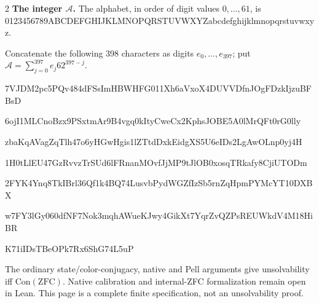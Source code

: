 \documentclass[10pt]{article}
\begin{document}
\begin{multicols}{2}
\textbf{The integer $\mathcal A$.}
The alphabet, in order of digit values $0,\ldots,61$, is
{\fontsize{7.7}{8.2}\selectfont\ttfamily 0123456789ABCDEFGHIJKLMNOPQRSTUVWXYZabcdefghijklmnopqrstuvwxyz}.\par
Concatenate the following 398 characters as digits $e_0,\ldots,e_{397}$;
put $\mathcal A=\sum_{j=0}^{397}e_j62^{397-j}$.\par
\begingroup\fontsize{7.7}{8.2}\selectfont\ttfamily
7VJDM2pc5PQv484dFSsImHBWHFG011Xh6aVxoX4DUVVDfnJOgFDzkIjzuBFBsD\par
6ojI1MLCnoBzx9PSxtmAr9B4vgq0kItyCweCx2KphsJOBE5A0lMrQFt0rG0lly\par
zbaKqAVagZqTlh47o6yHGwHgis1lZTtdDxkEidgXS5U6eIDs2LgAwOLnp0yj4H\par
1H0tLlEU47GzRvvzTrSUd6lFRnanMOvfJjMP9tJlOB0xosqTRkafy8CjiUTODm\par
2FYK4Ynq8TkIBrl36Qf1k4BQ74LusvbPydWGZfIzSb5rnZqHpmPYMcYT10DXBX\par
w7FY3lGy060dfNF7Nok3mqhAWueKJwy4GikXt7YqrZvQZPsREUWkdV4M18HiBR\par
K71iIDsTBeOPk7Rx6ShG74L5uP\par
\endgroup
\normalfont\fontsize{7.7}{8.2}\selectfont
The ordinary state/color-conjugacy, native and Pell arguments give
unsolvability iff $\mathrm{Con}(\mathrm{ZFC})$.
Native calibration and internal-ZFC formalization remain open in Lean.
This page is a complete finite specification, not an unsolvability proof.
\end{multicols}
\end{document}
